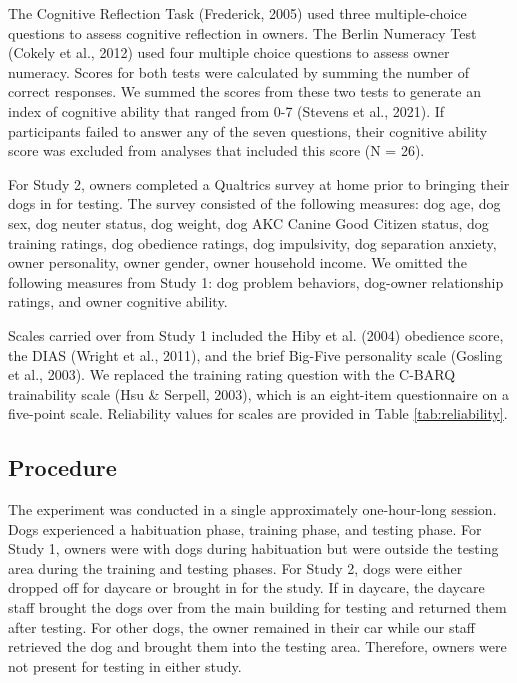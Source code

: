\documentclass[
  pub,floatsintext]{apa6}
\begin{document}
The Cognitive Reflection Task (Frederick, 2005) used three multiple-choice questions to assess cognitive reflection in owners. The Berlin Numeracy Test (Cokely et al., 2012) used four multiple choice questions to assess owner numeracy. Scores for both tests were calculated by summing the number of correct responses. We summed the scores from these two tests to generate an index of cognitive ability that ranged from 0-7 (Stevens et al., 2021). If participants failed to answer any of the seven questions, their cognitive ability score was excluded from analyses that included this score (N = 26).

For Study 2, owners completed a Qualtrics survey at home prior to bringing their dogs in for testing. The survey consisted of the following measures: dog age, dog sex, dog neuter status, dog weight, dog AKC Canine Good Citizen status, dog training ratings, dog obedience ratings, dog impulsivity, dog separation anxiety, owner personality, owner gender, owner household income. We omitted the following measures from Study 1: dog problem behaviors, dog-owner relationship ratings, and owner cognitive ability.

Scales carried over from Study 1 included the Hiby et al. (2004) obedience score, the DIAS (Wright et al., 2011), and the brief Big-Five personality scale (Gosling et al., 2003). We replaced the training rating question with the C-BARQ trainability scale (Hsu \& Serpell, 2003), which is an eight-item questionnaire on a five-point scale. Reliability values for scales are provided in Table \ref{tab:reliability}.

\hypertarget{procedure}{%
\subsection{Procedure}\label{procedure}}

The experiment was conducted in a single approximately one-hour-long session. Dogs experienced a habituation phase, training phase, and testing phase. For Study 1, owners were with dogs during habituation but were outside the testing area during the training and testing phases. For Study 2, dogs were either dropped off for daycare or brought in for the study. If in daycare, the daycare staff brought the dogs over from the main building for testing and returned them after testing. For other dogs, the owner remained in their car while our staff retrieved the dog and brought them into the testing area. Therefore, owners were not present for testing in either study.
\end{document}
